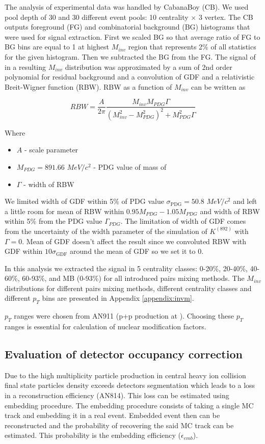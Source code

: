 The analysis of experimental data was handled by CabanaBoy (CB). We used pool depth of 30 and 30 different event pools: 10 centrality $\times$ 3 vertex. The CB outputs foreground (FG) and combinatorial background (BG) histograms that were used for \Kstar signal extraction. First we scaled BG so that average ratio of FG to BG bins are equal to 1 at highest $M_{inv}$ region that represents 2\% of all statistics for the given histogram. Then we subtracted the BG from the FG. The signal of \Kstar in a resulting $M_{inv}$ distribution was approximated by a sum of 2nd order polynomial for residual background and a convolution of GDF and a relativistic Breit-Wigner function (RBW). RBW as a function of $M_{inv}$ can be written as

\begin{equation}
	RBW = \frac{A}{2 \pi} \frac{M_{inv} M_{PDG} \Gamma}{(M_{inv}^2 - M_{PDG}^2)^2 + M_{PDG}^2 \Gamma}
	\label{eq:rbw}
\end{equation}

Where
\begin{itemize}
	\item $A$ - scale parameter
	\item $M_{PDG} = 891.66$ $MeV/c^2$ - PDG value of mass of \Kstar \cite{pdg}
	\item $\Gamma$ - width of RBW
\end{itemize}

We limited width of GDF within 5\% of PDG value $\sigma_{\text{PDG}} = 50.8$ $MeV/c^2$ \cite{pdg} and left a little room for mean of RBW within $0.95 M_{PDG} - 1.05 M_{PDG}$ and width of RBW within 5\% from the PDG value $\Gamma_{PDG}$. The limitation of width of GDF comes from the uncertainty of the width parameter of the simulation of $K^(892)$ with $\Gamma=0$. Mean of GDF doesn't affect the result since we convoluted RBW with GDF within $10 \sigma_{\text{GDF}}$ around the mean of GDF so we set it to 0.

In this analysis we extracted the signal in 5 centrality classes: 0-20\%, 20-40\%, 40-60\%, 60-93\%, and MB (0-93\%) for all introduced pairs mixing methods. The $M_{inv}$ distributions for different pairs mixing methods, different centrality classes and different $p_T$ bins are presented in Appendix \ref{appendix:invm}. 

$p_T$ ranges were chosen from AN911 (p+p \Kstar production at \snn). Choosing these $p_T$ ranges is essential for calculation of nuclear modification factors.

\subsection{Evaluation of detector occupancy correction}
Due to the high multiplicity particle production in central heavy ion collision final state particles density exceeds detectors segmentation which leads to a loss in a reconstruction efficiency (AN814). This loss can be estimated using embedding procedure. The embedding procedure consists of taking a single MC track and embedding it in a real event. Embedded event then can be reconstructed and the probability of recovering the said MC track can be estimated. This probability is the embedding efficiency ($\epsilon_{emb}$).

